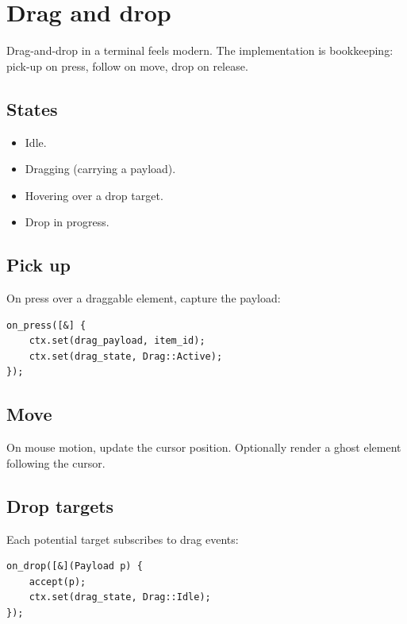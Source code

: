 \chapter{Drag and drop}
\label{ch:dnd}

\begin{aside}
Drag-and-drop in a terminal feels modern. The implementation
is bookkeeping: pick-up on press, follow on move, drop on
release.
\end{aside}

\section{States}

\begin{itemize}[leftmargin=*]
  \item Idle.
  \item Dragging (carrying a payload).
  \item Hovering over a drop target.
  \item Drop in progress.
\end{itemize}

\section{Pick up}

On press over a draggable element, capture the payload:

\begin{lstlisting}
on_press([&] {
    ctx.set(drag_payload, item_id);
    ctx.set(drag_state, Drag::Active);
});
\end{lstlisting}

\section{Move}

On mouse motion, update the cursor position. Optionally
render a ghost element following the cursor.

\section{Drop targets}

Each potential target subscribes to drag events:

\begin{lstlisting}
on_drop([&](Payload p) {
    accept(p);
    ctx.set(drag_state, Drag::Idle);
});
\end{lstlisting}

